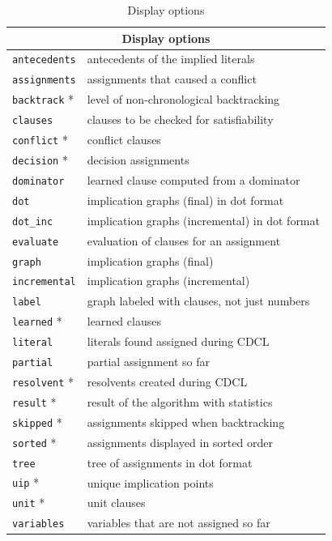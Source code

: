 \documentclass[11pt]{report}
\newcommand*{\p}[1]{\textup{\texttt{#1}}}
\begin{document}
\begin{table}[tbp]
\begin{center}
\begin{tabular}{|l|l|}
\hline
\multicolumn{2}{|c|}{\textbf{\large Display options}}\\
\hline
\p{antecedents}&  antecedents of the implied literals\\
\p{assignments}& assignments that caused a conflict         \\
\p{backtrack} *&  level of non-chronological backtracking    \\
\p{clauses}   &  clauses to be checked for satisfiability   \\
\p{conflict} * &  conflict clauses                           \\
\p{decision} * &  decision assignments                       \\
\p{dominator} &  learned clause computed from a dominator   \\
\p{dot}       &  implication graphs (final) in dot format           \\
\p{dot\_inc}  &  implication graphs (incremental) in dot format\\
\p{evaluate}  &  evaluation of clauses for an assignment    \\
\p{graph}     &  implication graphs (final)                 \\
\p{incremental}& implication graphs (incremental)           \\
\p{label}     &  graph labeled with clauses, not just numbers\\
\p{learned} *  &  learned clauses                            \\
\p{literal}   &  literals found assigned during CDCL        \\
\p{partial}   &  partial assignment so far                  \\
\p{resolvent} * &  resolvents created during CDCL             \\
\p{result} *   &  result of the algorithm with statistics    \\
\p{skipped} *  &  assignments skipped when backtracking      \\
\p{sorted} *   & assignments displayed in sorted order\\
\p{tree}       &  tree of assignments in dot format\\
\p{uip} *       &  unique implication points                  \\
\p{unit} *     &  unit clauses                               \\
\p{variables} &  variables that are not assigned so far     \\
\hline
\end{tabular}
\end{center}
\caption{Display options}\label{tab.display}
\end{table}
\end{document}
